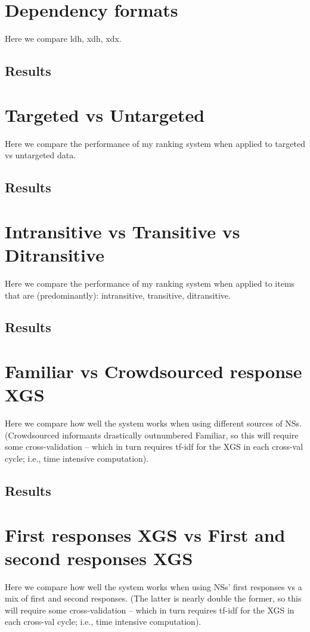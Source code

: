 \section{Dependency formats}
\label{section:experiment-dependency-formats}
Here we compare ldh, xdh, xdx.
\subsection{Results}
\label{subsection:dependency-formats-results}

\section{Targeted vs Untargeted}
\label{section:experiment-targeted}
Here we compare the performance of my ranking system when applied to targeted vs untargeted data.
\subsection{Results}
\label{subsection:targeted-results}

\section{Intransitive vs Transitive vs Ditransitive}
\label{section:experiment-transitive}
Here we compare the performance of my ranking system when applied to items that are (predominantly): intransitive, transitive, ditransitive.
\subsection{Results}
\label{subsection:transitive-results}

\section{Familiar vs Crowdsourced response XGS}
\label{section:experiment-crowdsource}
Here we compare how well the system works when using different sources of NSs. (Crowdsourced informants drastically outnumbered Familiar, so this will require some cross-validation -- which in turn requires tf-idf for the XGS in each cross-val cycle; i.e., time intensive computation).
\subsection{Results}
\label{subsection:crowdsource-results}

\section{First responses XGS vs First and second responses XGS}
\label{section:experiment-first-responses}
Here we compare how well the system works when using NSs' first responses vs a mix of first and second responses. (The latter is nearly double the former, so this will require some cross-validation -- which in turn requires tf-idf for the XGS in each cross-val cycle; i.e., time intensive computation).
